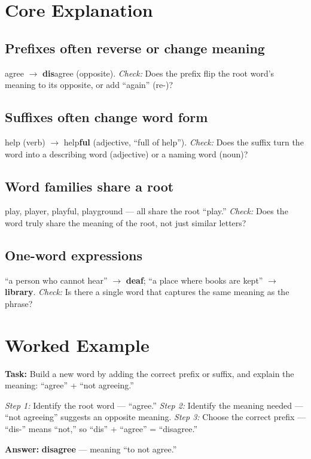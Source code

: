 \section{Core Explanation}

\subsection*{Prefixes often reverse or change meaning}
agree $\rightarrow$ \textbf{dis}agree (opposite). \textit{Check:} Does the prefix flip the root word's meaning to its opposite, or add ``again'' (re-)?

\subsection*{Suffixes often change word form}
help (verb) $\rightarrow$ help\textbf{ful} (adjective, ``full of help''). \textit{Check:} Does the suffix turn the word into a describing word (adjective) or a naming word (noun)?

\subsection*{Word families share a root}
play, player, playful, playground --- all share the root ``play.'' \textit{Check:} Does the word truly share the meaning of the root, not just similar letters?

\subsection*{One-word expressions}
``a person who cannot hear'' $\rightarrow$ \textbf{deaf}; ``a place where books are kept'' $\rightarrow$ \textbf{library}. \textit{Check:} Is there a single word that captures the same meaning as the phrase?

\section{Worked Example}
\begin{examplebox}
\textbf{Task:} Build a new word by adding the correct prefix or suffix, and explain the meaning: ``agree'' + ``not agreeing.''

\textit{Step 1:} Identify the root word --- ``agree.''
\textit{Step 2:} Identify the meaning needed --- ``not agreeing'' suggests an opposite meaning.
\textit{Step 3:} Choose the correct prefix --- ``dis-'' means ``not,'' so ``dis'' + ``agree'' = ``disagree.''

\textbf{Answer:} \textbf{disagree} --- meaning ``to not agree.''
\end{examplebox}

